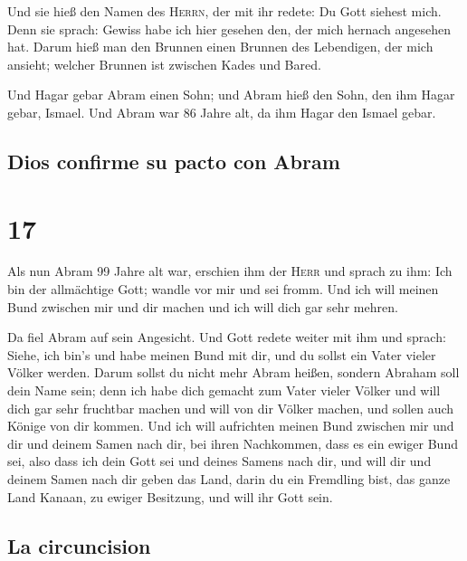  Und sie hieß den Namen des \textsc{Herrn}, der mit ihr
redete: Du Gott siehest mich. Denn sie sprach: Gewiss habe ich hier
gesehen den, der mich hernach angesehen hat.  Darum hieß
man den Brunnen einen Brunnen des Lebendigen, der mich ansieht; welcher
Brunnen ist zwischen Kades und Bared.

 Und Hagar gebar Abram einen Sohn; und Abram hieß den
Sohn, den ihm Hagar gebar, Ismael.  Und Abram war 86
Jahre alt, da ihm Hagar den Ismael gebar.

\hypertarget{dios-confirme-su-pacto-con-abram}{%
\subsection{Dios confirme su pacto con
Abram}\label{dios-confirme-su-pacto-con-abram}}

\hypertarget{section-16}{%
\section{17}\label{section-16}}

 Als nun Abram 99 Jahre alt war, erschien ihm der
\textsc{Herr} und sprach zu ihm: Ich bin der allmächtige Gott; wandle
vor mir und sei fromm.  Und ich will meinen Bund zwischen
mir und dir machen und ich will dich gar sehr mehren.

 Da fiel Abram auf sein Angesicht. Und Gott redete weiter
mit ihm und sprach:  Siehe, ich bin's und habe meinen Bund
mit dir, und du sollst ein Vater vieler Völker werden. 
Darum sollst du nicht mehr Abram heißen, sondern Abraham soll dein Name
sein; denn ich habe dich gemacht zum Vater vieler Völker 
und will dich gar sehr fruchtbar machen und will von dir Völker machen,
und sollen auch Könige von dir kommen.  Und ich will
aufrichten meinen Bund zwischen mir und dir und deinem Samen nach dir,
bei ihren Nachkommen, dass es ein ewiger Bund sei, also dass ich dein
Gott sei und deines Samens nach dir,  und will dir und
deinem Samen nach dir geben das Land, darin du ein Fremdling bist, das
ganze Land Kanaan, zu ewiger Besitzung, und will ihr Gott sein.

\hypertarget{la-circuncision}{%
\subsection{La circuncision}\label{la-circuncision}}

